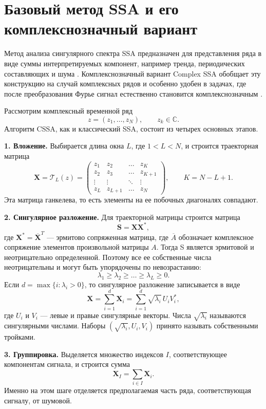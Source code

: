 \section{Базовый метод SSA и его комплекснозначный вариант}

Метод анализа сингулярного спектра SSA предназначен для представления ряда в виде суммы интерпретируемых компонент, например тренда, периодических составляющих и шума \cite{ts_structure,ssa_with_r}. Комплекснозначный вариант Complex SSA обобщает эту конструкцию на случай комплексных рядов и особенно удобен в задачах, где после преобразования Фурье сигнал естественно становится комплекснозначным \cite{zhornikova2016}.

Рассмотрим комплексный временной ряд
\[
z = (z_1,\dots,z_N), \qquad z_k \in \mathbb{C}.
\]
Алгоритм CSSA, как и классический SSA, состоит из четырех основных этапов.

\textbf{1. Вложение.}
Выбирается длина окна $L$, где $1 < L < N$, и строится траекторная матрица
\[
\mathbf{X} = \mathcal{T}_L(z) =
\begin{pmatrix}
	z_1 & z_2 & \dots & z_K \\
	z_2 & z_3 & \dots & z_{K+1} \\
	\vdots & \vdots & \ddots & \vdots \\
	z_L & z_{L+1} & \dots & z_N
\end{pmatrix},
\qquad K = N-L+1.
\]
Эта матрица ганкелева, то есть элементы на ее побочных диагоналях совпадают.

\textbf{2. Сингулярное разложение.}
Для траекторной матрицы строится матрица
\[
\mathbf{S} = \mathbf{X}\mathbf{X}^{*},
\]
где $\mathbf{X}^{*} = \overline{\mathbf{X}}^{T}$ --- эрмитово сопряженная матрица, где $\overline{A}$ обозначает комплексное сопряжение элементов произвольной матрицы $A$. Тогда S является эрмитовой и неотрицательно определенной. Поэтому все ее собственные числа неотрицательны и могут быть упорядочены по невозрастанию:
\[
\lambda_1 \ge \lambda_2 \ge \dots \ge \lambda_L \ge 0.
\]
Если $d=\max\{i\colon \lambda_i>0\}$, то сингулярное разложение записывается в виде
\[
\mathbf{X} = \sum_{i=1}^{d}\mathbf{X}_i
=
\sum_{i=1}^{d}\sqrt{\lambda_i}\,U_iV_i^{*},
\]
где $U_i$ и $V_i$ --- левые и правые сингулярные векторы. Числа $\sqrt{\lambda_i}$ называются сингулярными числами. Наборы $(\sqrt{\lambda_i},U_i,V_i)$ принято называть собственными тройками.

\textbf{3. Группировка.}
Выделяется множество индексов $I$, соответствующее компонентам сигнала, и строится сумма
\[
\mathbf{X}_I = \sum_{i\in I}\mathbf{X}_i.
\]
Именно на этом шаге отделяется предполагаемая часть ряда, соответствующая сигналу, от шумовой.

